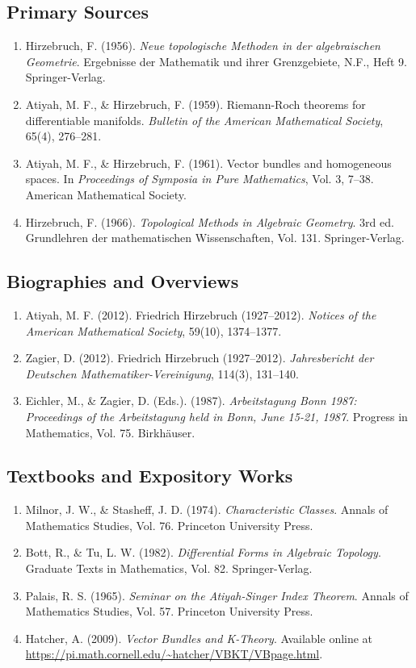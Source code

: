 \subsection*{Primary Sources}
\begin{enumerate}
    \item Hirzebruch, F. (1956). \textit{Neue topologische Methoden in der algebraischen Geometrie}. Ergebnisse der Mathematik und ihrer Grenzgebiete, N.F., Heft 9. Springer-Verlag.
    \item Atiyah, M. F., \& Hirzebruch, F. (1959). Riemann-Roch theorems for differentiable manifolds. \textit{Bulletin of the American Mathematical Society}, 65(4), 276--281.
    \item Atiyah, M. F., \& Hirzebruch, F. (1961). Vector bundles and homogeneous spaces. In \textit{Proceedings of Symposia in Pure Mathematics}, Vol. 3, 7--38. American Mathematical Society.
    \item Hirzebruch, F. (1966). \textit{Topological Methods in Algebraic Geometry}. 3rd ed. Grundlehren der mathematischen Wissenschaften, Vol. 131. Springer-Verlag.
\end{enumerate}

\subsection*{Biographies and Overviews}
\begin{enumerate}
    \item Atiyah, M. F. (2012). Friedrich Hirzebruch (1927--2012). \textit{Notices of the American Mathematical Society}, 59(10), 1374--1377.
    \item Zagier, D. (2012). Friedrich Hirzebruch (1927--2012). \textit{Jahresbericht der Deutschen Mathematiker-Vereinigung}, 114(3), 131--140.
    \item Eichler, M., \& Zagier, D. (Eds.). (1987). \textit{Arbeitstagung Bonn 1987: Proceedings of the Arbeitstagung held in Bonn, June 15-21, 1987}. Progress in Mathematics, Vol. 75. Birkhäuser.
\end{enumerate}

\subsection*{Textbooks and Expository Works}
\begin{enumerate}
    \item Milnor, J. W., \& Stasheff, J. D. (1974). \textit{Characteristic Classes}. Annals of Mathematics Studies, Vol. 76. Princeton University Press.
    \item Bott, R., \& Tu, L. W. (1982). \textit{Differential Forms in Algebraic Topology}. Graduate Texts in Mathematics, Vol. 82. Springer-Verlag.
    \item Palais, R. S. (1965). \textit{Seminar on the Atiyah-Singer Index Theorem}. Annals of Mathematics Studies, Vol. 57. Princeton University Press.
    \item Hatcher, A. (2009). \textit{Vector Bundles and K-Theory}. Available online at \url{https://pi.math.cornell.edu/~hatcher/VBKT/VBpage.html}.
\end{enumerate}
